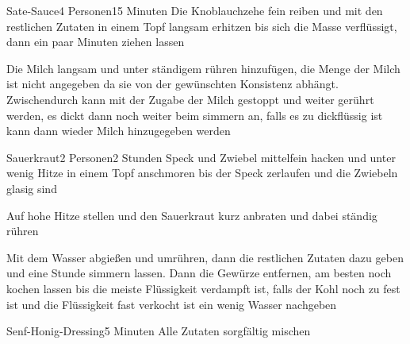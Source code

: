 
\begin{recipe}{Sate-Sauce}{4 Personen}{15 Minuten}
Die Knoblauchzehe fein reiben und mit den restlichen Zutaten in einem Topf langsam erhitzen bis sich die Masse verflüssigt, dann ein paar Minuten ziehen lassen

Die Milch langsam und unter ständigem rühren hinzufügen, die Menge der Milch ist nicht angegeben da sie von der gewünschten Konsistenz abhängt. Zwischendurch kann mit der Zugabe der Milch gestoppt und weiter gerührt werden, es dickt dann noch weiter beim simmern an, falls es zu dickflüssig ist kann dann wieder Milch hinzugegeben werden
\end{recipe}


\begin{recipe}{Sauerkraut}{2 Personen}{2 Stunden}
Speck und Zwiebel mittelfein hacken und unter wenig Hitze in einem Topf anschmoren bis der Speck zerlaufen und die Zwiebeln glasig sind

Auf hohe Hitze stellen und den Sauerkraut kurz anbraten und dabei ständig rühren

Mit dem Wasser abgießen und umrühren, dann die restlichen Zutaten dazu geben und eine Stunde simmern lassen. Dann die Gewürze entfernen, am besten noch kochen lassen bis die meiste Flüssigkeit verdampft ist, falls der Kohl noch zu fest ist und die Flüssigkeit fast verkocht ist ein wenig Wasser nachgeben
\end{recipe}


\begin{recipe}{Senf-Honig-Dressing}{}{5 Minuten}
Alle Zutaten sorgfältig mischen
\end{recipe}

